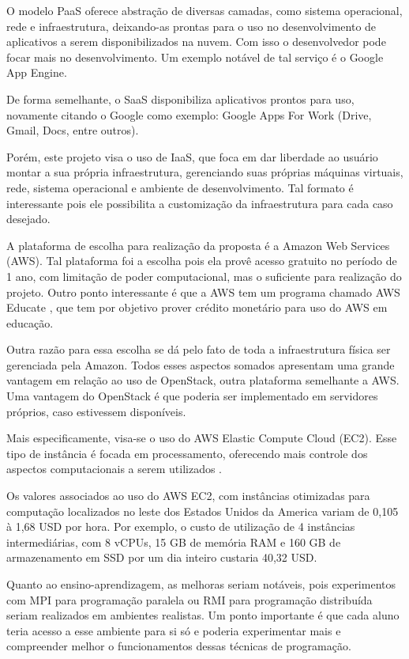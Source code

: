 \documentclass[12pt]{article}
\begin{document}
O modelo PaaS oferece abstração de diversas camadas, como sistema operacional, rede e infraestrutura, deixando-as prontas para o uso no desenvolvimento de aplicativos a serem disponibilizados na nuvem. Com isso o desenvolvedor pode focar mais no desenvolvimento. Um exemplo notável de tal serviço é o Google App Engine.

De forma semelhante, o SaaS disponibiliza aplicativos prontos para uso, novamente citando o Google como exemplo: Google Apps For Work (Drive, Gmail, Docs, entre outros).

Porém, este projeto visa o uso de IaaS, que foca em dar liberdade ao usuário montar a sua própria infraestrutura, gerenciando suas próprias máquinas virtuais, rede, sistema operacional e ambiente de desenvolvimento. Tal formato é interessante pois ele possibilita a customização da infraestrutura para cada caso desejado.

A plataforma de escolha para realização da proposta é a Amazon Web Services (AWS). Tal plataforma foi a escolha pois ela provê acesso gratuito no período de 1 ano, com limitação de poder computacional, mas o  suficiente para realização do projeto. Outro ponto interessante é que a AWS tem um programa chamado AWS Educate \cite{awsedu}, que tem por objetivo prover crédito monetário para uso do AWS em educação.

Outra razão para essa escolha se dá pelo fato de toda a infraestrutura física ser gerenciada pela Amazon. Todos esses aspectos somados apresentam uma grande vantagem em relação ao uso de OpenStack, outra plataforma semelhante a AWS. Uma vantagem do OpenStack é que poderia ser implementado em servidores próprios, caso estivessem disponíveis.

Mais especificamente, visa-se o uso do AWS Elastic Compute Cloud (EC2). Esse tipo de instância é focada em processamento, oferecendo mais controle dos aspectos computacionais a serem utilizados \cite{ec2}.

Os valores associados ao uso do AWS EC2, com instâncias otimizadas para computação localizados no leste dos Estados Unidos da America variam de 0,105 à 1,68 USD por hora. Por exemplo, o custo de utilização de 4 instâncias intermediárias, com 8 vCPUs, 15 GB de memória RAM e 160 GB de armazenamento em SSD por um dia inteiro custaria 40,32 USD.

Quanto ao ensino-aprendizagem, as melhoras seriam notáveis, pois experimentos com MPI para programação paralela ou RMI para programação distribuída seriam realizados em ambientes realistas. Um ponto importante é que cada aluno teria acesso a esse ambiente para si só e poderia experimentar mais e compreender melhor o funcionamentos dessas técnicas de programação.
\end{document}
